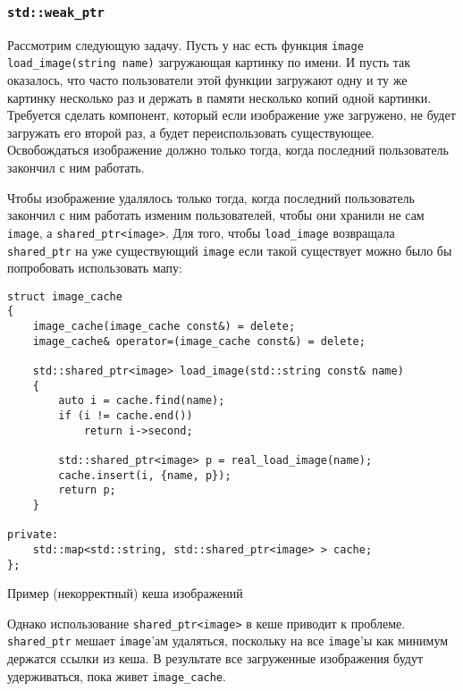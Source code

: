 \subsubsection{\texttt{std::weak_ptr}}

Рассмотрим следующую задачу. Пусть у нас есть функция \texttt{image load_image(string name)} загружающая картинку по имени. И пусть так оказалось, что часто пользователи этой функции загружают одну и ту же картинку несколько раз и держать в памяти несколько копий одной картинки. Требуется сделать компонент, который если изображение уже загружено, не будет загружать его второй раз, а будет переиспользовать существующее. Освобождаться изображение должно только тогда, когда последний пользователь закончил с ним работать.

Чтобы изображение удалялось только тогда, когда последний пользователь закончил с ним работать изменим пользователей, чтобы они хранили не сам \texttt{image}, а \texttt{shared_ptr<image>}. Для того, чтобы \texttt{load_image} возвращала \texttt{shared_ptr} на уже существующий \texttt{image} если такой существует можно было бы попробовать использовать мапу:

\begin{listing}
\begin{verbatim}
struct image_cache
{
    image_cache(image_cache const&) = delete;
    image_cache& operator=(image_cache const&) = delete;

    std::shared_ptr<image> load_image(std::string const& name)
    {
        auto i = cache.find(name);
        if (i != cache.end())
            return i->second;

        std::shared_ptr<image> p = real_load_image(name);
        cache.insert(i, {name, p});
        return p;
    }

private:
    std::map<std::string, std::shared_ptr<image> > cache;
};
\end{verbatim}
\caption{Пример (некорректный) кеша изображений}
\label{listing:shared_ptr_image_cache_broken}
\end{listing}

Однако использование \texttt{shared_ptr<image>} в кеше приводит к проблеме. \texttt{shared_ptr} мешает \texttt{image}'ам удаляться, поскольку на все \texttt{image}'ы как минимум держатся ссылки из кеша. В результате все загруженные изображения будут удерживаться, пока живет \texttt{image_cache}.

